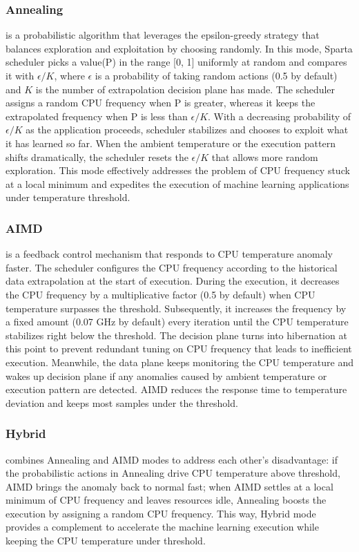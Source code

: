 \subsubsection{Annealing} is a probabilistic algorithm that leverages the epsilon-greedy strategy that balances exploration and exploitation by choosing randomly. In this mode, Sparta scheduler picks a value(P) in the range [0, 1] uniformly at random and compares it with $\epsilon/K$, where $\epsilon$ is a probability of taking random actions (0.5 by default) and $K$ is the number of extrapolation decision plane has made. The scheduler assigns a random CPU frequency when P is greater, whereas it keeps the extrapolated frequency when P is less than $\epsilon/K$. With a decreasing probability of $\epsilon/K$ as the application proceeds, scheduler stabilizes and chooses to exploit what it has learned so far. When the ambient temperature or the execution pattern shifts dramatically, the scheduler resets the $\epsilon/K$ that allows more random exploration. This mode effectively addresses the problem of CPU frequency stuck at a local minimum and expedites the execution of machine learning applications under temperature threshold.

\subsubsection{AIMD} is a feedback control mechanism that responds to CPU temperature anomaly faster. The scheduler configures the CPU frequency according to the historical data extrapolation at the start of execution. During the execution, it decreases the CPU frequency by a multiplicative factor (0.5 by default) when CPU temperature surpasses the threshold. Subsequently, it increases the frequency by a fixed amount (0.07 GHz by default) every iteration until the CPU temperature stabilizes right below the threshold. The decision plane turns into hibernation at this point to prevent redundant tuning on CPU frequency that leads to inefficient execution. Meanwhile, the data plane keeps monitoring the CPU temperature and wakes up decision plane if any anomalies caused by ambient temperature or execution pattern are detected. AIMD reduces the response time to temperature deviation and keeps most samples under the threshold. 

\subsubsection{Hybrid} combines Annealing and AIMD modes to address each other's disadvantage: if the probabilistic actions in Annealing drive CPU temperature above threshold, AIMD brings the anomaly back to normal fast; when AIMD settles at a local minimum of CPU frequency and leaves resources idle, Annealing boosts the execution by assigning a random CPU frequency. This way, Hybrid mode provides a complement to accelerate the machine learning execution while keeping the CPU temperature under threshold. 
